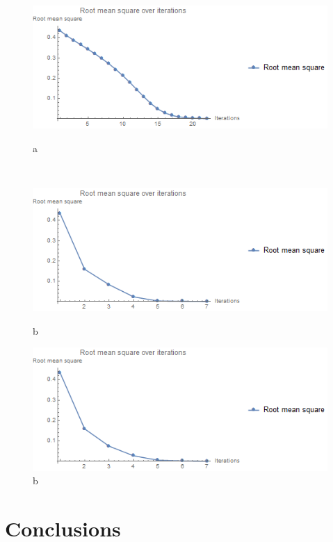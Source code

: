 \begin{figure}
	\centering
	\begin{minipage}{.3\textwidth}
		\includegraphics[width=1\linewidth]{images/rms_fixed}
		\caption{a}	
	\end{minipage}~
	\begin{minipage}{.3\textwidth}
		\includegraphics[width=1\linewidth]{images/rms_linesearch}
		\caption{b}	
	\end{minipage}
	\begin{minipage}{.3\textwidth}
		\includegraphics[width=1\linewidth]{images/rms_parallelsearch}
		\caption{b}	
	\end{minipage}
	\label{fig:nucleon_rms}
\end{figure}

\section{Conclusions}

